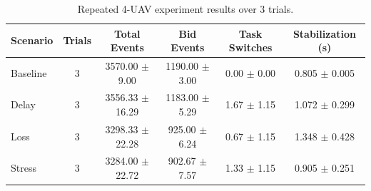 \begin{table}[t]
\centering
\caption{Repeated 4-UAV experiment results over 3 trials.}
\label{tab:repeated-study-results}
\begin{tabular}{lccccc}
\hline
Scenario & Trials & Total Events & Bid Events & Task Switches & Stabilization (s) \\
\hline
Baseline & 3 & 3570.00 $\pm$ 9.00 & 1190.00 $\pm$ 3.00 & 0.00 $\pm$ 0.00 & 0.805 $\pm$ 0.005 \\
Delay & 3 & 3556.33 $\pm$ 16.29 & 1183.00 $\pm$ 5.29 & 1.67 $\pm$ 1.15 & 1.072 $\pm$ 0.299 \\
Loss & 3 & 3298.33 $\pm$ 22.28 & 925.00 $\pm$ 6.24 & 0.67 $\pm$ 1.15 & 1.348 $\pm$ 0.428 \\
Stress & 3 & 3284.00 $\pm$ 22.72 & 902.67 $\pm$ 7.57 & 1.33 $\pm$ 1.15 & 0.905 $\pm$ 0.251 \\
\hline
\end{tabular}
\end{table}
